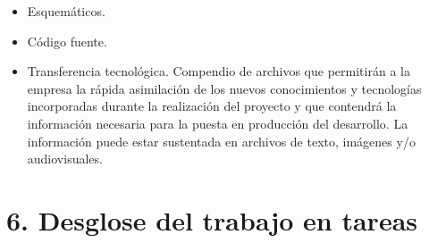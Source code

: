 \documentclass[11pt]{charter}
\begin{document}
\begin{itemize}
\item Esquemáticos.
\item Código fuente.
\item Transferencia tecnológica. Compendio de archivos que permitirán a la empresa la rápida asimilación de los nuevos conocimientos y tecnologías incorporadas durante la realización del proyecto y que contendrá la información necesaria para la puesta en producción del desarrollo. La información puede estar sustentada en archivos de texto, imágenes y/o audiovisuales.

\end{itemize}



\section{6. Desglose del trabajo en tareas}
\label{sec:wbs}


\end{document}

